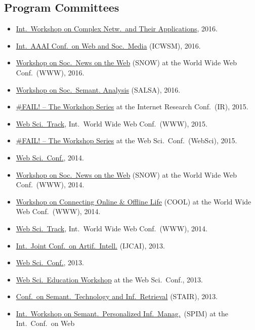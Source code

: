 \documentclass[line,mm]{res}
\newcounter{x}
\begin{document}
\begin{resume}
\section{Program Committees}
\begin{itemize}
\item \href{http://complexnetworks.org/index2016.html}{Int.\ Workshop on
  Complex Netw.\ and Their Applications}, 2016.  
\item \href{http://www.icwsm.org/2016/index.php}{Int.\ AAAI Conf.\ on
  Web and Soc.\ Media} (ICWSM), 2016.
\item \href{http://www.snow-workshop.org/}{Workshop on Soc.\ News on
  the Web} (SNOW) at the World Wide Web Conf.\ (WWW), 2016. 
\item \href{http://events.kmi.open.ac.uk/salsa2016/}{Workshop on Soc.\ Semant. Analysis} (SALSA), 2016.
\item \href{https://failworkshops.wordpress.com/fail-at-ir16/}{\#FAIL!
  -- The Workshop Series} at the Internet Research Conf.\ (IR), 2015.
\item \href{http://www.www2015.it/call-for-web-science-track/}{Web
  Sci.\ Track}, Int.\ World Wide Web Conf.\ (WWW), 2015.
\item \href{https://failworkshops.wordpress.com/fail-workshop-at-websci15/}{\#FAIL! -- The Workshop Series} at the Web Sci.\ Conf.\ (WebSci), 2015.
\item \href{http://www.websci14.org/}{Web Sci.\ Conf.},
  2014. 
\item \href{http://www.snow-workshop.org/}{Workshop on Soc.\ News on
  the Web} (SNOW) at the World Wide Web Conf.\ (WWW), 2014.
\item \href{http://www.cool2014.com/}{Workshop on Connecting Online \&
  Offline Life} (COOL) at the World Wide Web Conf.\ (WWW), 2014. 
\item \href{http://www2014.kr/calls/call-for-web-science-track/}{Web
  Sci.\ Track}, Int.\ World Wide Web Conf.\ (WWW), 2014.
\item \href{http://ijcai13.org/}{Int.\ Joint Conf.\ on Artif.\ Intell.} (IJCAI), 2013.  
\item \href{http://www.websci13.org/}{Web Sci.\ Conf.}, 2013. 
\item \href{http://webscience-education-workshop.blogs.usj.edu.lb/}{Web
  Sci.\ Education Workshop} at the Web Sci.\ Conf., 2013. 
\item \href{http://www.ftsm.ukm.my/stair13/}{Conf.\ on Semant.\ Technology and Inf.\ Retrieval} (STAIR), 2013. 
\item \href{http://spim-workshop.org/}{Int.\ Workshop on Semant.\ Personalized Inf.\ Manag.}\ (SPIM) at the Int.\ Conf.\ on Web

\end{itemize}
\end{resume}
\end{document}
